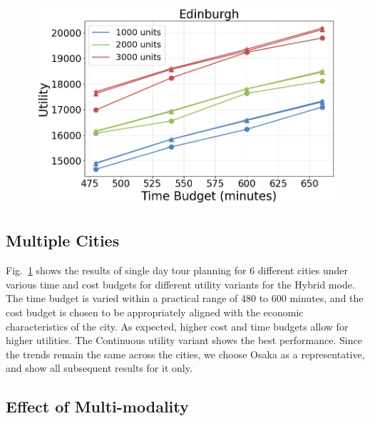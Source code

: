 \begin{figure}[t]
    \includegraphics[width=0.60\columnwidth]{plots/exp1-edinburgh.png}
    \label{fig:cities}
\end{figure}

\subsection{Multiple Cities}

Fig.~\ref{fig:cities} shows the results of single day tour planning for 6 different cities under various time and cost budgets for different utility variants for the Hybrid mode.
The time budget is varied within a practical range of 480 to 600 minutes, and the cost budget is chosen to be appropriately aligned with the economic characteristics of the city.
As expected, higher cost and time budgets allow for higher utilities.
The Continuous utility variant shows the best performance.
Since the trends remain the same across the cities, we choose Osaka as a representative, and show all subsequent results for it only.

\subsection{Effect of Multi-modality}

